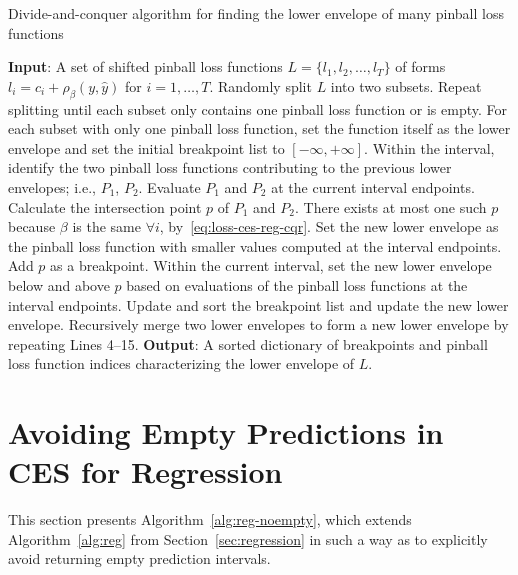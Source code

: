 \begin{algorithm}[H]
    \caption{Divide-and-conquer algorithm for finding the lower envelope of many pinball loss functions}
    \label{alg:envelope-cqr}
    \begin{algorithmic} [1]
        \STATE \textbf{Input}: A set of shifted pinball loss functions $L = \{l_1, l_2, \dots, l_T \}$ of forms $l_i = c_i + \rho_\beta(y, \hat{y})$ for $i=1,\dots, T$.
        \STATE Randomly split $L$ into two subsets. Repeat splitting until each subset only contains one pinball loss function or is empty.
        \STATE For each subset with only one pinball loss function, set the function itself as the lower envelope and set the initial breakpoint list to $[-\infty, +\infty]$.
            \STATE Within the interval, identify the two pinball loss functions contributing to the previous lower envelopes; i.e., $P_1$, $P_2$.
            \STATE Evaluate $P_1$ and $P_2$ at the current interval endpoints.
            \STATE Calculate the intersection point $p$ of $P_1$ and $P_2$. There exists at most one such $p$ because $\beta$ is the same $\forall i$, by~\eqref{eq:loss-ces-reg-cqr}.
            \STATE Set the new lower envelope as the pinball loss function with smaller values computed at the interval endpoints.
            \ELSE \STATE Add $p$ as a breakpoint.
            \STATE Within the current interval, set the new lower envelope below and above $p$ based on evaluations of the pinball loss functions at the interval endpoints.
            \ENDIF
            \STATE Update and sort the breakpoint list and update the new lower envelope.
        \ENDFOR
        \STATE Recursively merge two lower envelopes to form a new lower envelope by repeating Lines 4--15.
        \STATE \textbf{Output}: A sorted dictionary of breakpoints and pinball loss function indices characterizing the lower envelope of $L$.
\end{algorithmic}
\end{algorithm}



\section{Avoiding Empty Predictions in CES for Regression} \label{app:reg-noempty}

This section presents Algorithm~\ref{alg:reg-noempty}, which extends Algorithm~\ref{alg:reg} from Section~\ref{sec:regression} in such a way as to explicitly avoid returning empty prediction intervals.


